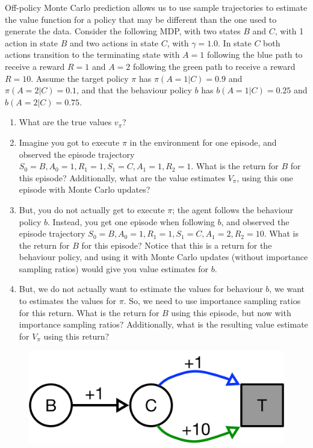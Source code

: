 Off-policy Monte Carlo prediction allows us to use sample trajectories to 
estimate the value function for a policy that may be different than the one
used to generate the data. Consider the following MDP, with two states $B$ and $C$, with 1 action in state $B$ and two actions in state $C$, with $\gamma = 1.0$. In state $C$ both actions transition to the terminating state with $A=1$ following the blue path to receive a reward $R=1$ and $A=2$ following the green path to receive a reward $R=10$. Assume the target policy $\pi$ has $\pi(A = 1 | C) = 0.9$ and $\pi(A = 2 | C) = 0.1$, and that the behaviour policy $b$ has $b(A = 1 | C) = 0.25$ and $b(A = 2 | C) = 0.75$.
\begin{enumerate}
\item What are the true values $v_\pi$?
\item Imagine you got to execute $\pi$ in the environment for one episode, and observed the episode trajectory $S_0 = B, A_0 = 1, R_1 = 1, S_1 = C, A_1 = 1, R_2 = 1$. What is the return for $B$ for this episode? Additionally, what are the value estimates $V_\pi$, using this one episode with Monte Carlo updates?
\item But, you do not actually get to execute $\pi$; the agent follows the behaviour policy $b$. Instead, you get one episode when following $b$, and observed the episode trajectory $S_0 = B, A_0 = 1, R_1 = 1, S_1 = C, A_1 = 2, R_2 = 10$. What is the return for $B$ for this episode? Notice that this is a return for the behaviour policy, and using it with Monte Carlo updates (without importance sampling ratios) would give you value estimates for $b$.  
\item But, we do not actually want to estimate the values for behaviour $b$, we want to estimates the values for $\pi$. So, we need to use importance sampling ratios for this return. What is the return for $B$ using this episode, but now with importance sampling ratios? Additionally, what is the resulting value estimate for $V_\pi$ using this return? 
\end{enumerate}
\begin{figure}[h!]
  \center
\includegraphics[width=0.5\linewidth]{figures/c2_2state.pdf}
\end{figure}



